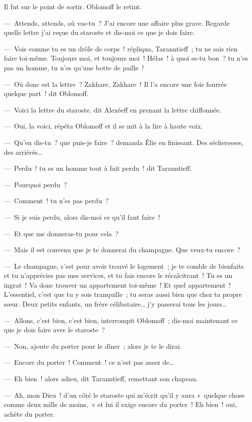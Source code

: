 \documentclass[french,twoside]{book} %
\begin{document}
Il fut sur le point de sortir. Oblomoff le retint.\par
— Attends, attends, où vas-tu ? J’ai encore une affaire plus grave. Regarde quelle lettre j’ai reçue du staroste et dis-moi ce que je dois faire.\par
— Vois comme tu es un drôle de corps ! répliqua, Taranntieff ; tu ne sais rien faire toi-même. Toujours moi, et toujours moi ! Hélas ! à quoi es-tu bon ? tu n’es pas un homme, tu n’es qu’une botte de paille !\par
— Où donc est la lettre ? Zakhare, Zakhare ! Il l’a encore une fois fourrée quelque part ! dit Oblomoff.\par
— Voici la lettre du staroste, dit Alexéeff en prenant la lettre chiffonnée.\par
— Oui, la voici, répéta Oblomoff et il se mit à la lire à haute voix.\par
— Qu’en dis-tu ? que puis-je faire ? demanda Élie en finissant. Des sécheresses, des arriérés…\par
— Perdu ! tu es un homme tout à fait perdu ! dit Taranntieff.\par
— Pourquoi perdu ?\par
— Comment ! tu n’es pas perdu ?\par
— Si je suis perdu, alors dis-moi ce qu’il faut faire !\par
— Et que me donneras-tu pour cela ?\par
— Mais il est convenu que je te donnerai du champagne. Que veux-tu encore ?\par
— Le champagne, c’est pour avoir trouvé le logement ; je te comble de bienfaits et tu n’apprécies pas mes services, et tu fais encore le récalcitrant ! Tu es un ingrat ! Va donc trouver un appartement toi-même ! Et quel appartement ! L’essentiel, c’est que tu y sois tranquille ; tu seras aussi bien que chez ta propre sœur. Deux petits enfants, un frère célibataire… j’y passerai tous les jours…\par
— Allons, c’est bien, c’est bien, interrompit Oblomoff ; dis-moi maintenant ce que je dois faire avec le staroste ?\par
— Non, ajoute du porter pour le dîner ; alors je te le dirai.\par
— Encore du porter ! Comment ! ce n’est pas assez de…\par
— Eh bien ! alors adieu, dit Taranntieff, remettant son chapeau.\par
— Ah, mon Dieu ! d’un côté le staroste qui m’écrit qu’il y aura « quelque chose comme deux mille de moins, » et lui il exige encore du porter ! Eh bien ! oui, achète du porter.\par
\end{document}
